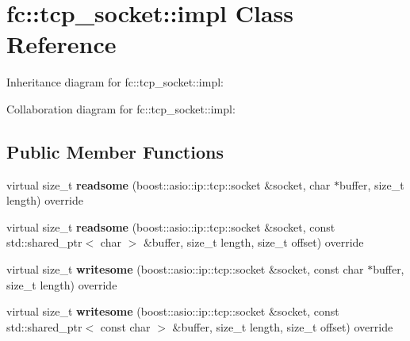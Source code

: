 \hypertarget{classfc_1_1tcp__socket_1_1impl}{}\section{fc\+:\+:tcp\+\_\+socket\+:\+:impl Class Reference}
\label{classfc_1_1tcp__socket_1_1impl}


Inheritance diagram for fc\+:\+:tcp\+\_\+socket\+:\+:impl\+:


Collaboration diagram for fc\+:\+:tcp\+\_\+socket\+:\+:impl\+:
\subsection*{Public Member Functions}
\begin{DoxyCompactItemize}
\item 
\mbox{\label{classfc_1_1tcp__socket_1_1impl_a227d73b46fe2857e60370ae8e6a8b281}} 
virtual size\+\_\+t {\bfseries readsome} (boost\+::asio\+::ip\+::tcp\+::socket \&socket, char $\ast$buffer, size\+\_\+t length) override
\item 
\mbox{\label{classfc_1_1tcp__socket_1_1impl_ab2755393e3ba9ee2de7db230d7f98e47}} 
virtual size\+\_\+t {\bfseries readsome} (boost\+::asio\+::ip\+::tcp\+::socket \&socket, const std\+::shared\+\_\+ptr$<$ char $>$ \&buffer, size\+\_\+t length, size\+\_\+t offset) override
\item 
\mbox{\label{classfc_1_1tcp__socket_1_1impl_af400365fe77a5d4bcf65f2c3b469ad7a}} 
virtual size\+\_\+t {\bfseries writesome} (boost\+::asio\+::ip\+::tcp\+::socket \&socket, const char $\ast$buffer, size\+\_\+t length) override
\item 
\mbox{\label{classfc_1_1tcp__socket_1_1impl_adf212edc6d5e21ffde8524b47f8566a8}} 
virtual size\+\_\+t {\bfseries writesome} (boost\+::asio\+::ip\+::tcp\+::socket \&socket, const std\+::shared\+\_\+ptr$<$ const char $>$ \&buffer, size\+\_\+t length, size\+\_\+t offset) override
\end{DoxyCompactItemize}
